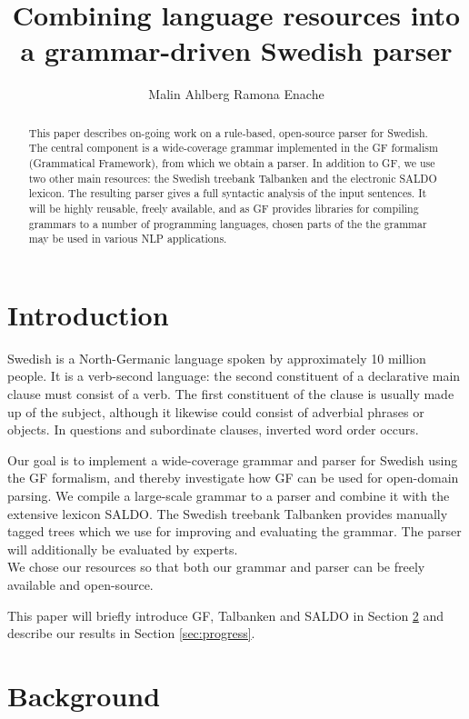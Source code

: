 \documentclass[submission]{eptcs} %
\title{ Combining language resources into a grammar-driven Swedish parser}
\author{Malin Ahlberg \qquad\qquad Ramona Enache

\institute{Department of Computer Science \& Engineering, Gothenburg University, Sweden}
}
\begin{document}
\maketitle

\begin{abstract}
This paper describes on-going work on a rule-based, open-source parser for
Swedish. The central component is a wide-coverage grammar implemented in the GF
formalism (Grammatical Framework), from which we obtain a parser. In addition
to GF, we use two other main resources: the Swedish treebank Talbanken and the
electronic SALDO lexicon.
The resulting parser gives a full syntactic analysis of the input sentences.
It will be highly reusable, freely available, and as GF provides libraries for
compiling grammars to a number of programming languages, chosen parts of the the 
grammar may be used in various NLP applications. 

\end{abstract}

\section{Introduction}
Swedish is a North-Germanic language spoken by approximately 10 million people.
It is a verb-second language: the second constituent of a declarative main
clause must consist of a verb.
The first constituent of the clause is usually made up of the subject,
although it likewise could consist of adverbial phrases or objects.
In questions and subordinate clauses, inverted word order occurs.

Our goal is to implement a wide-coverage grammar and parser for Swedish
using the GF formalism, and 
thereby investigate how GF can be used for open-domain parsing.
We compile a large-scale grammar to a parser
and combine it with the extensive lexicon SALDO. The Swedish treebank 
Talbanken provides manually tagged trees which we use for improving and evaluating
the grammar. The parser will additionally
be evaluated by experts. \\
We chose our resources so that both our grammar and parser can 
be freely available and open-source. 

This paper will briefly introduce GF, Talbanken and SALDO in Section \ref{sec:background}
and describe our results in Section \ref{sec:progress}.

\section{Background}
\label{sec:background}
\end{document}
